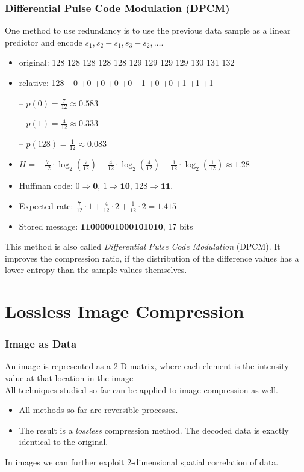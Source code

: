 \documentclass{beamer}
\begin{document}
\begin{frame}
\frametitle{Differential Pulse Code Modulation (DPCM)}
One method to use redundancy is to use the 
previous data sample as a linear predictor and encode $s_1, s_2-s_1, s_3-s_2, \dots$. 

\begin{itemize}
\item original: 128 128 128 128 128 129 129 129 129 130 131 132
\item relative: 128 +0 +0 +0 +0 +0 +1 +0 +0 +1 +1 +1

-- $p(0)=\frac{7}{12}\approx 0.583$

-- $p(1)=\frac{4}{12}\approx 0.333$

-- $p(128)=\frac{1}{12}\approx 0.083$

\item $H = -\frac{7}{12}\cdot \log_2(\frac{7}{12}) - \frac{4}{12}\cdot \log_2(\frac{4}{12}) 
- \frac{1}{12}\cdot \log_2(\frac{1}{12}) \approx 1.28$

\item Huffman code: $0 \Rightarrow \mathbf{0}$, $1 \Rightarrow \mathbf{10}$, $128 \Rightarrow \mathbf{11}$.

\item Expected rate: $\frac{7}{12}\cdot 1 + \frac{4}{12}\cdot 2 + \frac{1}{12}\cdot 2 = 1.415$

\item Stored message: $\mathbf{11000001000101010}$, 17 bits
\end{itemize}

This method is also called \textit{Differential Pulse Code Modulation} (DPCM). 
It improves the compression ratio, if the distribution of the difference 
values has a lower entropy than the sample values themselves. 
\end{frame}

\section{Lossless Image Compression}

\begin{frame}
\frametitle{Image as Data}
An image is represented as a 2-D matrix, where each element is the intensity
value at that location in the image
\\[6pt]

All techniques studied so far can be applied to image compression as well.
\\[6pt]

\begin{itemize}
\item All methods so far are reversible processes. 
\item The result is a \textit{lossless} compression method. The decoded data is 
exactly identical to the original. 
\end{itemize}


In images we can further exploit 2-dimensional spatial correlation of data.
\end{frame}
\end{document}
